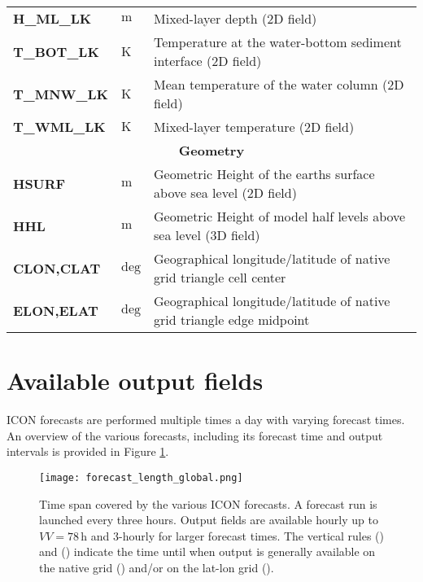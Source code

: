 \begin{longtable}{p{2.5cm}p{1.8cm}p{10.0cm}}
\textbf{H\_ML\_LK}                      &  $\mathrm{m}$               &  Mixed-layer depth (2D field)\\
\textbf{T\_BOT\_LK}                     &  $\mathrm{K}$               &  Temperature at the water-bottom sediment interface (2D field)\\
\textbf{T\_MNW\_LK}                     &  $\mathrm{K}$               &  Mean temperature of the water column (2D field)\\
\textbf{T\_WML\_LK}                     &  $\mathrm{K}$               &  Mixed-layer temperature (2D field)\\
\midrule
\multicolumn{3}{c}{\textbf{Geometry}}\\
\midrule
\textbf{HSURF}                          &  $\mathrm{m}$               &  Geometric Height of the earths surface above sea level (2D field) \\
\textbf{HHL}                            &  $\mathrm{m}$               &  Geometric Height of model half levels above sea level (3D field) \\
\textbf{CLON,CLAT}                      &  $\mathrm{deg}$             &  Geographical longitude/latitude of native grid triangle cell center \\
\textbf{ELON,ELAT}                      &  $\mathrm{deg}$             &  Geographical longitude/latitude of native grid triangle edge midpoint \\
  \bottomrule
\end{longtable}



\section{Available output fields}\label{sec_outfields}

ICON forecasts are performed multiple times a day with varying forecast times. An overview of the various forecasts, including its  
forecast time and output intervals is provided in Figure \ref{fig:forecast_length_global}.
\begin{figure}[hbt]
 \centering
 \texttt{[image: forecast\_length\_global.png]}
 \caption{Time span covered by the various ICON forecasts. A forecast run is launched every three hours.
 Output fields are available hourly up to $VV=78\,\mathrm{h}$ and 3-hourly for larger forecast times. 
 The vertical rules (\protect\markRed) and (\protect\markBlue) indicate the time until when output is generally 
 available on the native grid (\protect\markRed) and/or on the lat-lon grid (\protect\markBlue).}\label{fig:forecast_length_global}
\end{figure}

